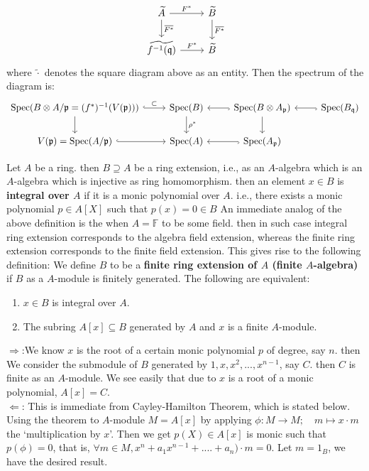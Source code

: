 \documentclass[12pt]{article}
\theoremstyle{definition}
\theoremstyle{plain}
\DeclareMathOperator{\Spec}{Spec}
\newcommand{\field}{\mathbb{F}}
\newcommand{\overbar}[1]{\mkern 1.5mu\overline{\mkern-1.5mu#1\mkern-1.5mu}\mkern 1.5mu}
\renewcommand{\bar}{\overbar}
\renewcommand{\tilde}{\widetilde}
\begin{document}
\begin{enumerate}
       \begin{equation}
         \begin{tikzcd}
       \tilde{A}\ar{r}{F^*}\ar{d}{\bar{F^*}}&\tilde{B}\ar{d}{\bar{F^*}}\\
       \tilde{f^{-1}(\mathfrak{q})}\ar{r}{F^*}&\tilde{B}
         \end{tikzcd}
       \end{equation}
   where $\tilde{\cdot}$ denotes the square diagram above as an entity.
    Then the spectrum of the diagram is:
    \begin{equation}
      \begin{tikzcd}
        \Spec(B\otimes A/\mathfrak{p}=(f^*)^{-1}(V(\mathfrak{p})))\ar[hook]{r}{\subset}\ar{d}
        &\Spec(B)\ar{d}{\rho^*}&\Spec(B\otimes A_\mathfrak{p})\ar{d}\ar[hook]{l}&\Spec(B_\mathfrak{q})\ar[hook]{l}\\
        V(\mathfrak{p})=\Spec(A/\mathfrak{p})\ar[hook]{r}&\Spec(A)&\Spec(A_\mathfrak{p})\ar[hook]{l}
      \end{tikzcd}
    \end{equation}
 \end{enumerate}

 \medskip
 \Def Let $A$ be a ring. then $B\supseteq A$ be a ring extension, i.e., as an $A$-algebra which is an $A$-algebra which is injective as ring homomorphism. then an element $x\in B$ is \textbf{integral over $A$} if it is a monic polynomial over $A$. i.e., there exists a monic polynomial $p\in A[X]$ such that $p(x)=0\in B$
 \Rmk An immediate analog of the above definition is the when $A=\field$ to be some field. then in such case integral ring extension corresponds to the algebra field extension, whereas the finite ring extension corresponds to the finite field extension. This gives rise to the following definition:
 \Def We define $B$ to be a \textbf{finite ring extension of $A$ (finite $A$-algebra)} if $B$ as a $A$-module is finitely generated.
 \Prop The following are equivalent:
 \begin{enumerate}
   \item $x\in B$ is integral over $A$.
   \item The subring $A[x]\subseteq B$ generated by $A$ and $x$ is a finite $A$-module.
 \end{enumerate}
 \proof $\Rightarrow$:We know $x$ is the root of a certain monic polynomial $p$ of degree, say $n$. then We consider the submodule of $B$ generated by $1, x, x^2,..., x^{n-1}$, say $C$. then $C$ is finite as an $A$-module. We see easily that due to $x$ is a root of a monic polynomial, $A[x]=C$.\\
 \indent $\Leftarrow$: This is immediate from Cayley-Hamilton Theorem, which is stated below. Using the theorem to $A$-module $M=A[x]$ by applying $\phi:M\to M; \quad m\mapsto x\cdot m$ the `multiplication by $x$'. Then we get $p(X)\in A[x]$ is monic such that $p(\phi)=0$, that is, $\forall m\in M, x^n+a_1x^{n-1}+....+a_n)\cdot m=0$. Let $m=1_B$, we have the desired result.
\end{document}
